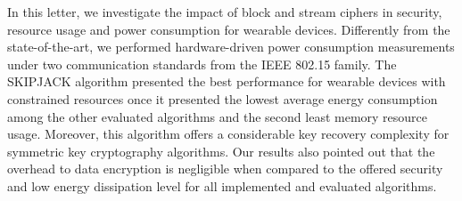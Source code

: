 
In this letter, we investigate the impact of block and stream ciphers in security, resource usage and power consumption for wearable devices. Differently from the state-of-the-art, we performed hardware-driven power consumption measurements under two communication standards from the IEEE 802.15 family. The SKIPJACK algorithm presented the best performance for wearable devices with constrained resources once it presented the lowest average energy consumption among the other evaluated algorithms and the second least memory resource usage. Moreover, this algorithm offers a considerable key recovery complexity for symmetric key cryptography algorithms. Our results also pointed out that the overhead to data encryption is negligible when compared to the offered security and low energy dissipation level for all implemented and evaluated algorithms. %

